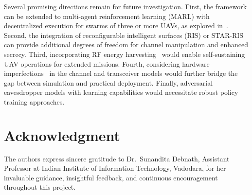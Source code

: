 \documentclass[journal]{IEEEtran}
\begin{document}
Several promising directions remain for future investigation. First, the framework can be extended to multi-agent reinforcement learning (MARL) with decentralized execution for swarms of three or more UAVs, as explored in~\cite{lyu2023madrl}. Second, the integration of reconfigurable intelligent surfaces (RIS) or STAR-RIS~\cite{pandeystarris2026} can provide additional degrees of freedom for channel manipulation and enhanced secrecy. Third, incorporating RF energy harvesting~\cite{pandey2025rfeh, pandeyaoidrl2025} would enable self-sustaining UAV operations for extended missions. Fourth, considering hardware imperfections~\cite{pandeyiot2023, pandeyrfehiot2025} in the channel and transceiver models would further bridge the gap between simulation and practical deployment. Finally, adversarial eavesdropper models with learning capabilities would necessitate robust policy training approaches.

\section*{Acknowledgment}
The authors express sincere gratitude to Dr.\ Sunandita Debnath, Assistant Professor at Indian Institute of Information Technology, Vadodara, for her invaluable guidance, insightful feedback, and continuous encouragement throughout this project.
\end{document}
